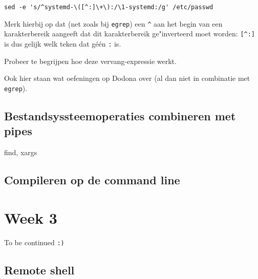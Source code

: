 \documentclass[a4paper,twoside,openany]{memoir}
\begin{document}
\begin{verbatim}
sed -e 's/^systemd-\([^:]\+\):/\1-systemd:/g' /etc/passwd
\end{verbatim}

Merk hierbij op dat (net zoals bij \verb!egrep!) een \verb!^! aan het begin van een karakterbereik aangeeft dat dit karakterbereik ge"inverteerd moet worden: \verb![^:]! is dus gelijk welk teken dat g\'e\'en \verb!:! is.

Probeer te begrijpen hoe deze vervang-expressie werkt.

Ook hier staan wat oefeningen op Dodona over (al dan niet in combinatie met \verb!egrep!).

\chapter{Bestandsyssteemoperaties combineren met pipes}
find, xargs

\chapter{Compileren op de command line}

\part{Week 3}

To be continued \verb!:)!

\chapter{Remote shell}

\end{document}
